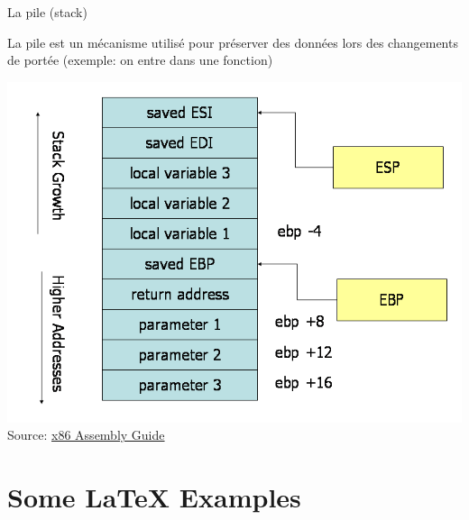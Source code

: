 \documentclass[10pt,xcolor={table,dvipsnames},t]{beamer}
\begin{document}
\begin{frame}{La pile (stack)}

La pile est un mécanisme utilisé pour préserver des données lors des changements de portée (exemple: on entre dans une fonction)

\begin{center}
\includegraphics[width=.60\textwidth,height=.56\textheight]{Stack-convention}\newline{}
Source: \href{https://www.cs.virginia.edu/~evans/cs216/guides/x86.html}{x86 Assembly Guide}
\end{center}

\end{frame}




\section{Some \LaTeX{} Examples}
\end{document}
